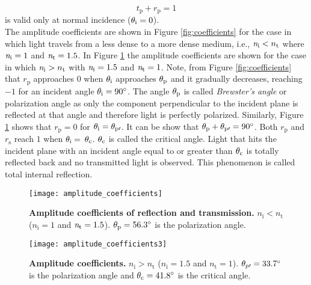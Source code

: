 \begin{equation}
t_\textrm{p}+r_\textrm{p} =  1
\end{equation}
is valid only at normal incidence ($\theta_{\textrm{i}} = 0$).
\\ \indent The amplitude coefficients are shown in Figure \ref{fig:coefficients} for the case in which light travels from a less dense to a more dense medium, i.e., $\textit{n}_\textrm{i}<n_\textrm{t}$ where $\textit{n}_{\textrm{i}}= 1$ and $\textit{n}_{\textrm{t}}=1.5$. 
In Figure \ref{fig:coefficients2} the amplitude coefficients are shown for the case in which $\textit{n}_\textrm{i}>n_\textrm{t}$ with $\textit{n}_{\textrm{i}}= 1.5$ and $\textit{n}_{\textrm{t}}=1$. Note, from Figure \ref{fig:coefficients} that $r_\textrm{p}$ approaches $0$ when $\theta_\textrm{i}$ approaches $\theta_\textrm{p}$ and it gradually decreases, reaching $-1$ for an incident angle $\theta_\textrm{i}=90^\circ$. The angle $\theta_\textrm{p}$ is called \textit{Brewster's angle} or polarization angle as only the component perpendicular to the incident plane is reflected at that angle and therefore light is perfectly polarized. Similarly, Figure \ref{fig:coefficients2} shows that $r_\textrm{p}=0$ for $\theta_\textrm{i}= \theta_{\textrm{p}\prime}$. It can be show that $\theta_\textrm{p}+ \theta_{\textrm{p}\prime}= 90^\circ$. Both $r_\textrm{p}$ and $r_\textrm{s}$ reach $1$ when $\theta_\textrm{i}= $ $\theta_\textrm{c}$. $\theta_\textrm{c}$ is called the critical angle. Light that hits the incident plane with an incident angle equal to or greater than $\theta_{\textrm{c}}$ is totally reflected back and no transmitted light is observed. This phenomenon is called total internal reflection. 
\begin{figure}[t]
  \begin{minipage}[h]{0.48\textwidth}
    \texttt{[image: amplitude\_coefficients]}
    \caption{\textbf{Amplitude coefficients of reflection and transmission.} $n_\textrm{i}<n_\textrm{t}$
($n_\textrm{i} = 1$ and $\textit{n}_\textrm{t}=1.5$). $\theta_\textrm{p} = 56.3^\circ$ is the polarization angle.}
    \label{fig:coefficients}
  \end{minipage}\hfill
  \begin{minipage}[h]{0.48\textwidth}
    \texttt{[image: amplitude\_coefficients3]}
    \caption{\textbf{Amplitude coefficients.} $n_\textrm{i}>n_\textrm{t}$
($n_\textrm{i} = 1.5$ and $n_\textrm{t}=1$). $\theta_{p\prime}= 33.7^\circ$ is the polarization angle and $\theta_\textrm{c}= 41.8^\circ$ is the critical angle.}
   \label{fig:coefficients2}
 \end{minipage}
\end{figure}\\
